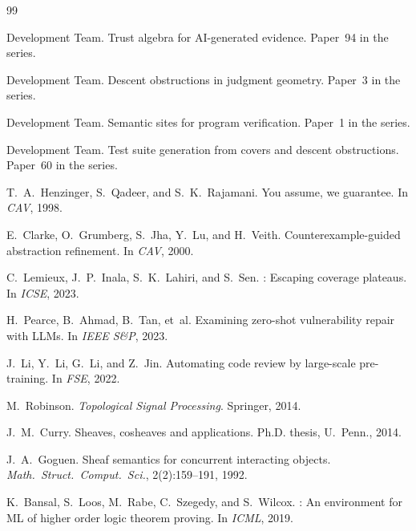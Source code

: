 \documentclass[11pt]{article}
\begin{document}

\begin{thebibliography}{99}

\JuGeo{} Development Team.
\newblock Trust algebra for AI-generated evidence.
\newblock Paper~94 in the \JuGeo{} series.

\JuGeo{} Development Team.
\newblock Descent obstructions in judgment geometry.
\newblock Paper~3 in the \JuGeo{} series.

\JuGeo{} Development Team.
\newblock Semantic sites for program verification.
\newblock Paper~1 in the \JuGeo{} series.

\JuGeo{} Development Team.
\newblock Test suite generation from covers and descent obstructions.
\newblock Paper~60 in the \JuGeo{} series.

T.~A.~Henzinger, S.~Qadeer, and S.~K.~Rajamani.
\newblock You assume, we guarantee.
\newblock In \emph{CAV}, 1998.

E.~Clarke, O.~Grumberg, S.~Jha, Y.~Lu, and H.~Veith.
\newblock Counterexample-guided abstraction refinement.
\newblock In \emph{CAV}, 2000.

C.~Lemieux, J.~P.~Inala, S.~K.~Lahiri, and S.~Sen.
: Escaping coverage plateaus.
\newblock In \emph{ICSE}, 2023.

H.~Pearce, B.~Ahmad, B.~Tan, et~al.
\newblock Examining zero-shot vulnerability repair with LLMs.
\newblock In \emph{IEEE S\&P}, 2023.

J.~Li, Y.~Li, G.~Li, and Z.~Jin.
\newblock Automating code review by large-scale pre-training.
\newblock In \emph{FSE}, 2022.

M.~Robinson.
\newblock \emph{Topological Signal Processing}.
\newblock Springer, 2014.

J.~M.~Curry.
\newblock Sheaves, cosheaves and applications.
\newblock Ph.D. thesis, U.~Penn., 2014.

J.~A.~Goguen.
\newblock Sheaf semantics for concurrent interacting objects.
\newblock \emph{Math.~Struct.~Comput.~Sci.}, 2(2):159--191, 1992.

K.~Bansal, S.~Loos, M.~Rabe, C.~Szegedy, and S.~Wilcox.
: An environment for ML of higher order logic theorem proving.
\newblock In \emph{ICML}, 2019.


\end{thebibliography}
\end{document}
